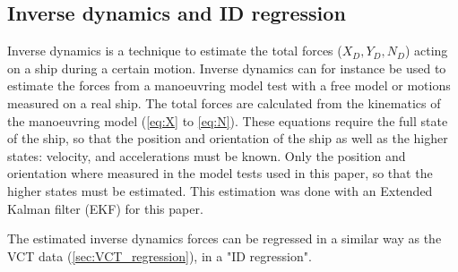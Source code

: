 \subsection{Inverse dynamics and ID regression}
\label{sec:inverse_dynamics}
Inverse dynamics is a technique to estimate the total forces ($X_D,Y_D,N_D$) acting on a ship during a certain motion. Inverse dynamics can for instance be used to estimate the forces from a manoeuvring model test with a free model or motions measured on a real ship. The total forces are calculated from the kinematics of the manoeuvring model (\autoref{eq:X} to \autoref{eq:N}). These equations require the full state of the ship, so that the position and orientation of the ship as well as the higher states: velocity, and accelerations must be known. 
Only the position and orientation where measured in the model tests used in this paper, so that the higher states must be estimated. This estimation was done with an Extended Kalman filter (EKF) for this paper.

The estimated inverse dynamics forces can be regressed in a similar way as the VCT data (\autoref{sec:VCT_regression}), in a "ID regression".  
